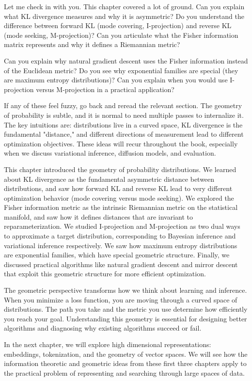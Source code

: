 \begin{pausebox}
Let me check in with you. This chapter covered a lot of ground. Can you explain what KL divergence measures and why it is asymmetric? Do you understand the difference between forward KL (mode covering, I-projection) and reverse KL (mode seeking, M-projection)? Can you articulate what the Fisher information matrix represents and why it defines a Riemannian metric?

\vspace{0.5em}

Can you explain why natural gradient descent uses the Fisher information instead of the Euclidean metric? Do you see why exponential families are special (they are maximum entropy distributions)? Can you explain when you would use I-projection versus M-projection in a practical application?

\vspace{0.5em}

If any of these feel fuzzy, go back and reread the relevant section. The geometry of probability is subtle, and it is normal to need multiple passes to internalize it. The key intuitions are: distributions live in a curved space, KL divergence is the fundamental "distance," and different directions of measurement lead to different optimization objectives. These ideas will recur throughout the book, especially when we discuss variational inference, diffusion models, and evaluation.
\end{pausebox}

\vspace{1em}

This chapter introduced the geometry of probability distributions. We learned about KL divergence as the fundamental asymmetric distance between distributions, and saw how forward KL and reverse KL lead to very different optimization behavior (mode covering versus mode seeking). We explored the Fisher information metric as the intrinsic Riemannian metric on the statistical manifold, and saw how it defines distances that are invariant to reparameterization. We studied I-projection and M-projection as two dual ways to approximate a target distribution, corresponding to Bayesian inference and variational inference respectively. We saw how maximum entropy distributions are exponential families, which have special geometric structure. Finally, we discussed practical algorithms like natural gradient descent and mirror descent that exploit this geometric structure for more efficient optimization.

The geometric perspective transforms how we think about learning and inference. When you minimize a loss function, you are moving through a curved space of distributions. The path you take and the metric you use determine how efficiently you reach your goal. Understanding this geometry is essential for designing better algorithms and diagnosing why existing algorithms succeed or fail.

In the next chapter, we will explore high dimensional representations: embeddings, tokenization, and the geometry of vector spaces. We will see how the information theoretic and geometric ideas from these first three chapters apply to the practical problem of representing and searching through large spaces of data.